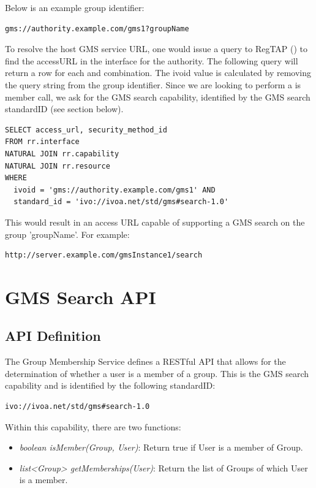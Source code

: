 \documentclass[11pt,a4paper]{ivoa}
\begin{document}
Below is an example group identifier:

\begin{verbatim}
gms://authority.example.com/gms1?groupName
\end{verbatim}

To resolve the host GMS service URL, one would issue a query to RegTAP (\citep{std:RegTAP}) to find the accessURL in the interface for the authority.  The following query will return a row for each  and  combination.  The ivoid value is calculated by removing the query string from the group identifier.  Since we are looking to perform a is member call, we ask for the GMS search capability, identified by the GMS search standardID (see section below).

\begin{verbatim}
SELECT access_url, security_method_id
FROM rr.interface
NATURAL JOIN rr.capability
NATURAL JOIN rr.resource
WHERE
  ivoid = 'gms://authority.example.com/gms1' AND
  standard_id = 'ivo://ivoa.net/std/gms#search-1.0'
\end{verbatim}

This would result in an access URL capable of supporting a GMS search on the group 'groupName'.  For example:

\begin{verbatim}
http://server.example.com/gmsInstance1/search
\end{verbatim}

\section{GMS Search API}

\subsection{API Definition}

The Group Membership Service defines a RESTful API \citep{fielding00} that allows for the determination of whether a user is a member of a group.  This is the GMS search capability and is identified by the following standardID:

\begin{verbatim}
ivo://ivoa.net/std/gms#search-1.0
\end{verbatim}

Within this capability, there are two functions:

\begin{itemize}
\item \emph{boolean isMember(Group, User)}: Return true if User is a member of Group.
\item \emph{list<Group> getMemberships(User)}: Return the list of Groups of which User is a member.
\end{itemize}
\end{document}
